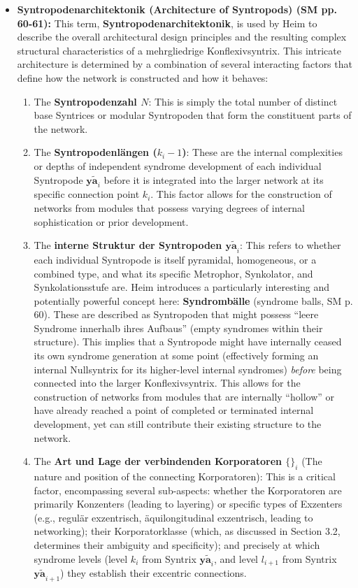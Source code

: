 \documentclass[12pt]{article}
\newcommand{\q}[1]{\enquote{#1}}
\newcommand{\syntrix}{\bm{y\widetilde{a}}}
\begin{document}
\begin{itemize}
    \item \textbf{Syntropodenarchitektonik (Architecture of Syntropods) (SM pp. 60-61):}
    This term, \textbf{Syntropodenarchitektonik}, is used by Heim to describe the overall architectural design principles and the resulting complex structural characteristics of a mehrgliedrige Konflexivsyntrix. This intricate architecture is determined by a combination of several interacting factors that define how the network is constructed and how it behaves:
    \begin{enumerate}
        \item The \textbf{Syntropodenzahl \( N \)}: This is simply the total number of distinct base Syntrices or modular Syntropoden that form the constituent parts of the network.
        \item The \textbf{Syntropodenlängen (\( k_i - 1 \))}: These are the internal complexities or depths of independent syndrome development of each individual Syntropode \( \syntrix_i \) before it is integrated into the larger network at its specific connection point \( k_i \). This factor allows for the construction of networks from modules that possess varying degrees of internal sophistication or prior development.
        \item The \textbf{interne Struktur der Syntropoden \( \syntrix_i \)}: This refers to whether each individual Syntropode is itself pyramidal, homogeneous, or a combined type, and what its specific Metrophor, Synkolator, and Synkolationsstufe are. Heim introduces a particularly interesting and potentially powerful concept here: \textbf{Syndrombälle} (syndrome balls, SM p. 60). These are described as Syntropoden that might possess \q{leere Syndrome innerhalb ihres Aufbaus} (empty syndromes within their structure). This implies that a Syntropode might have internally ceased its own syndrome generation at some point (effectively forming an internal Nullsyntrix for its higher-level internal syndromes) \textit{before} being connected into the larger Konflexivsyntrix. This allows for the construction of networks from modules that are internally \q{hollow} or have already reached a point of completed or terminated internal development, yet can still contribute their existing structure to the network.
        \item The \textbf{Art und Lage der verbindenden Korporatoren \( \{ \}_i \)} (The nature and position of the connecting Korporatoren): This is a critical factor, encompassing several sub-aspects: whether the Korporatoren are primarily Konzenters (leading to layering) or specific types of Exzenters (e.g., regulär exzentrisch, äquilongitudinal exzentrisch, leading to networking); their Korporatorklasse (which, as discussed in Section 3.2, determines their ambiguity and specificity); and precisely at which syndrome levels (level \( k_i \) from Syntrix \( \syntrix_i \), and level \( l_{i+1} \) from Syntrix \( \syntrix_{i+1} \)) they establish their excentric connections.

\end{enumerate}
\end{itemize}
\end{document}
